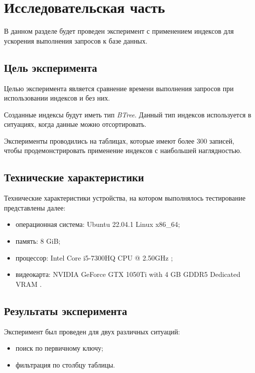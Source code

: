 \chapter{Исследовательская часть}

В данном разделе будет проведен эксперимент с применением индексов для ускорения выполнения запросов к базе данных.


\section{Цель эксперимента}

Целью эксперимента является сравнение времени выполнения запросов при использовании индексов и без них. 

Созданные индексы будут иметь тип \textit{BTree}. Данный тип индексов используется в ситуациях, когда данные можно отсортировать.

Эксперименты проводились на таблицах, которые имеют более 300 записей, чтобы продемонстрировать применение индексов с наибольшей наглядностью.

\section{Технические характеристики}

Технические характеристики устройства, на котором выполнялось тестирование представлены далее:

\begin{itemize}
    \item операционная система: Ubuntu 22.04.1 \cite{ubuntu} Linux \cite{linux} x86\_64;
    \item память: 8 GiB;
    \item процессор: Intel Core i5-7300HQ CPU @ 2.50GHz \cite{intel};
    \item видеокарта: NVIDIA GeForce GTX 1050Ti with 4 GB GDDR5 Dedicated VRAM \cite{gtx1050}.
\end{itemize}


\section{Результаты эксперимента}

Эксперимент был проведен для двух различных ситуаций: 

\begin{itemize}
    \item поиск по первичному ключу;
    \item фильтрация по столбцу таблицы.
\end{itemize}


